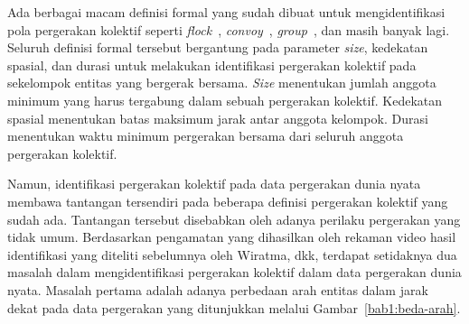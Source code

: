 

\iffalse 

\lionov{sebaiknya ada ilustrasi kayak Figure 1.7 di thesis, buat memperjelas apa itu pergerakan kolektif} \cristopher{sedang digambar}.
\fi

Ada berbagai macam definisi formal yang sudah dibuat untuk mengidentifikasi pola pergerakan kolektif seperti \textit{flock}~\cite{cao:flock, gudmundsson:flock}, \textit{convoy}~\cite{jeung:convoys}, \textit{group}~\cite{buchin:group, yida:group}, dan masih banyak lagi. Seluruh definisi formal tersebut bergantung pada parameter \textit{size}\iffalse \lionov{ini jadi aneh, pake {\it size} aja deh} kelompok \fi, kedekatan spasial, dan durasi untuk melakukan identifikasi pergerakan kolektif pada sekelompok entitas yang bergerak bersama. \textit{Size} menentukan jumlah anggota minimum yang harus tergabung dalam sebuah pergerakan kolektif. Kedekatan spasial menentukan batas maksimum jarak antar anggota kelompok. Durasi menentukan waktu minimum pergerakan bersama dari seluruh anggota pergerakan kolektif.

Namun, identifikasi pergerakan kolektif pada data pergerakan dunia nyata membawa tantangan tersendiri pada beberapa definisi pergerakan kolektif yang sudah ada. Tantangan tersebut disebabkan oleh adanya perilaku pergerakan yang tidak umum. Berdasarkan pengamatan yang dihasilkan oleh rekaman video hasil identifikasi yang diteliti sebelumnya oleh Wiratma, dkk\footnotemark[8], terdapat setidaknya dua masalah dalam mengidentifikasi pergerakan kolektif dalam data pergerakan dunia nyata. Masalah pertama adalah adanya perbedaan arah entitas dalam jarak dekat pada data pergerakan yang ditunjukkan melalui Gambar~\ref{bab1:beda-arah}.


